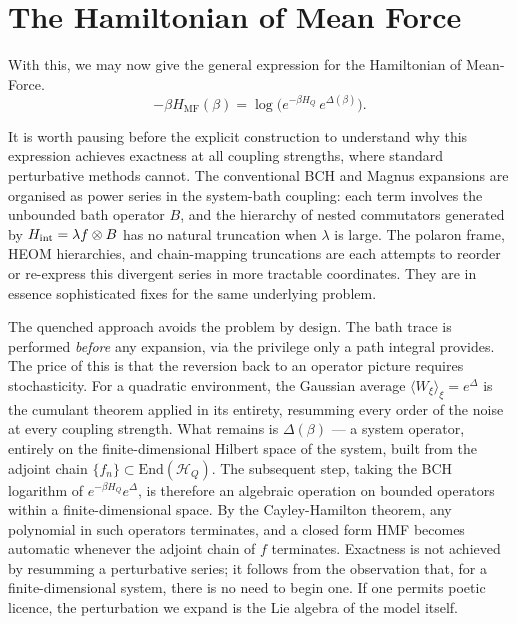 \section{The Hamiltonian of Mean Force\label{sec:qubit_closure}}
With this, we may now give the general expression for the Hamiltonian of Mean-Force. 
\begin{equation}
    -\beta H_{\mathrm{MF}}(\beta)
    = \log\!\big(e^{-\beta H_Q}\,e^{\Delta(\beta)}\big).
    \label{eq:HMF_log_def}
\end{equation}




It is worth pausing before the explicit construction to understand why this expression achieves
exactness at all coupling strengths, where standard perturbative methods cannot. The conventional
BCH and Magnus expansions are organised as power series in the system-bath coupling: each term
involves the unbounded bath operator $B$, and the hierarchy of nested commutators generated by $H_{\rm int} = \lambda f\otimes B$ has no natural truncation when $\lambda$ is large. The polaron frame, HEOM hierarchies, and chain-mapping truncations are each attempts to reorder or re-express this divergent series in more tractable coordinates. They are in essence sophisticated fixes for the same underlying problem.

The quenched approach avoids the problem by design. The bath trace is performed \emph{before} any
expansion, via the privilege only a path integral provides. The price of this is that the reversion back to an operator picture requires stochasticity. For a quadratic environment, the Gaussian average $\langle W_\xi\rangle_\xi = e^\Delta$
is the cumulant theorem applied in its entirety, resumming every order of the noise at every
coupling strength. What remains is $\Delta(\beta)$ — a system operator, entirely on the
finite-dimensional Hilbert space of the system, built from the adjoint chain
$\{f_n\}\subset\mathrm{End}(\mathcal{H}_Q)$. The subsequent step, taking the BCH logarithm of
$e^{-\beta H_Q}e^\Delta$, is therefore an algebraic operation on bounded operators within a
finite-dimensional space. By the Cayley-Hamilton theorem, any polynomial in such operators
terminates, and a closed form HMF becomes automatic
whenever the adjoint chain of $f$ terminates. Exactness is not achieved by resumming a
perturbative series; it follows from the observation that, for a finite-dimensional system, there
is no need to begin one. If one permits poetic licence, the perturbation we expand is the Lie algebra of the model itself.  

